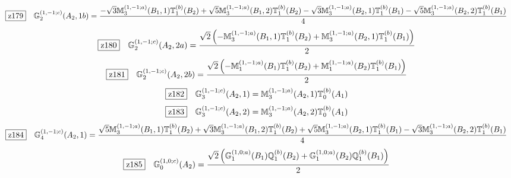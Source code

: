 \documentclass[fleqn,10pt,landscape]{jsarticle}
\begin{document}
\begin{dmath*}
\hspace*{3mm}\fbox{z179}\quad \mathbb{G}_{2}^{(1,-1;c)}(A_{2},1b)=\frac{- \sqrt{3} \mathbb{M}_{3}^{(1,-1;a)}(B_{1},1) \mathbb{T}_{1}^{(b)}(B_{2}) + \sqrt{5} \mathbb{M}_{3}^{(1,-1;a)}(B_{1},2) \mathbb{T}_{1}^{(b)}(B_{2}) - \sqrt{3} \mathbb{M}_{3}^{(1,-1;a)}(B_{2},1) \mathbb{T}_{1}^{(b)}(B_{1}) - \sqrt{5} \mathbb{M}_{3}^{(1,-1;a)}(B_{2},2) \mathbb{T}_{1}^{(b)}(B_{1})}{4}
\end{dmath*}
\begin{dmath*}
\hspace*{3mm}\fbox{z180}\quad \mathbb{G}_{2}^{(1,-1;c)}(A_{2},2a)=\frac{\sqrt{2} \left(- \mathbb{M}_{3}^{(1,-1;a)}(B_{1},1) \mathbb{T}_{1}^{(b)}(B_{2}) + \mathbb{M}_{3}^{(1,-1;a)}(B_{2},1) \mathbb{T}_{1}^{(b)}(B_{1})\right)}{2}
\end{dmath*}
\begin{dmath*}
\hspace*{3mm}\fbox{z181}\quad \mathbb{G}_{2}^{(1,-1;c)}(A_{2},2b)=\frac{\sqrt{2} \left(- \mathbb{M}_{1}^{(1,-1;a)}(B_{1}) \mathbb{T}_{1}^{(b)}(B_{2}) + \mathbb{M}_{1}^{(1,-1;a)}(B_{2}) \mathbb{T}_{1}^{(b)}(B_{1})\right)}{2}
\end{dmath*}
\begin{dmath*}
\hspace*{3mm}\fbox{z182}\quad \mathbb{G}_{3}^{(1,-1;c)}(A_{2},1)=\mathbb{M}_{3}^{(1,-1;a)}(A_{2},1) \mathbb{T}_{0}^{(b)}(A_{1})
\end{dmath*}
\begin{dmath*}
\hspace*{3mm}\fbox{z183}\quad \mathbb{G}_{3}^{(1,-1;c)}(A_{2},2)=\mathbb{M}_{3}^{(1,-1;a)}(A_{2},2) \mathbb{T}_{0}^{(b)}(A_{1})
\end{dmath*}
\begin{dmath*}
\hspace*{3mm}\fbox{z184}\quad \mathbb{G}_{4}^{(1,-1;c)}(A_{2},1)=\frac{\sqrt{5} \mathbb{M}_{3}^{(1,-1;a)}(B_{1},1) \mathbb{T}_{1}^{(b)}(B_{2}) + \sqrt{3} \mathbb{M}_{3}^{(1,-1;a)}(B_{1},2) \mathbb{T}_{1}^{(b)}(B_{2}) + \sqrt{5} \mathbb{M}_{3}^{(1,-1;a)}(B_{2},1) \mathbb{T}_{1}^{(b)}(B_{1}) - \sqrt{3} \mathbb{M}_{3}^{(1,-1;a)}(B_{2},2) \mathbb{T}_{1}^{(b)}(B_{1})}{4}
\end{dmath*}
\begin{dmath*}
\hspace*{3mm}\fbox{z185}\quad \mathbb{G}_{0}^{(1,0;c)}(A_{2})=\frac{\sqrt{2} \left(\mathbb{G}_{1}^{(1,0;a)}(B_{1}) \mathbb{Q}_{1}^{(b)}(B_{2}) + \mathbb{G}_{1}^{(1,0;a)}(B_{2}) \mathbb{Q}_{1}^{(b)}(B_{1})\right)}{2}
\end{dmath*}
\end{document}
